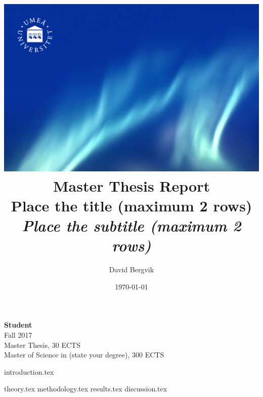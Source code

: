 \documentclass[a4paper,table]{article}
\title{
    \includegraphics[width=1\textwidth]{front.jpg} \\
    \vspace{0.7cm}
     Master Thesis Report\\
    \vspace{0.6cm}
    \LARGE Place the title (maximum 2 rows)\\ %
    \vspace{0.7cm}
    \large\textit{Place the subtitle (maximum 2 rows)}
    \vspace{0.8cm}
}
\author{
    David Bergvik
}
\date{\today}
\begin{document}
\pretitle{\begin{flushleft} \georgia \fontsize{30}{34}\selectfont}
\posttitle{\end{flushleft}}
\preauthor{\begin{flushleft} \georgia \linespread{1.4} \large}
\postauthor{\end{flushleft}}
\predate{} %
\postdate{} %

\maketitle
\vfill
\begin{flushleft}
    \small
    \textbf{Student} \\
    Fall 2017 \\
    Master Thesis, 30 ECTS\\
    Master of Science in (state your degree), 300 ECTS
\end{flushleft}

\thispagestyle{empty}
\restoregeometry
{introduction.tex}

{theory.tex}
{methodology.tex}
{results.tex}
{discussion.tex}
\end{document}
